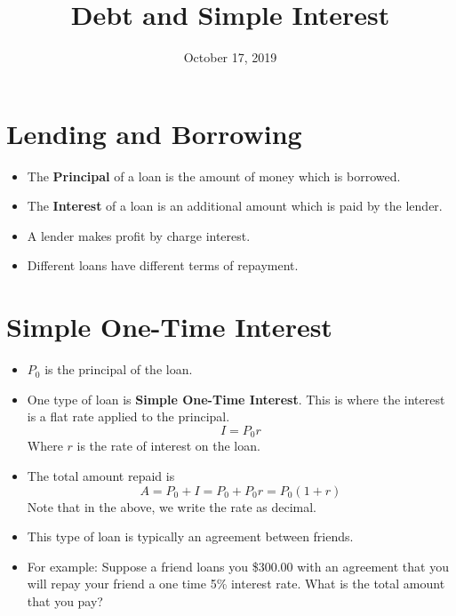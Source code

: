 \documentclass{article}
\title{Debt and Simple Interest}
\date{October 17, 2019}
\begin{document}
\maketitle

\section*{Lending and Borrowing}
\begin{itemize}
    \item The \textbf{Principal} of a loan is the amount of money
        which is borrowed.
    \item The \textbf{Interest} of a loan is an additional amount
        which is paid by the lender.
    \item A lender makes profit by charge interest.
    \item Different loans have different terms of repayment.
\end{itemize}

\section*{Simple One-Time Interest}
\begin{itemize}
    \item $P_0$ is the principal of the loan.
    \item One type of loan is \textbf{Simple One-Time Interest}.  This
        is where the interest is a flat rate applied to the principal.
    \[
        I=P_0r
    \]
    Where $r$ is the rate of interest on the loan.

    \item The total amount repaid is
    \[
        A=P_0 + I = P_0 + P_0r = P_0(1+r)
    \]
    Note that in the above, we write the rate as decimal.

    \item This type of loan is typically an agreement between friends.  

    \item For example: Suppose a friend loans you \$300.00 with an
    agreement that you will repay your friend a one time 5\% interest
    rate.  What is the total amount that you pay?
\end{itemize}
\end{document}
